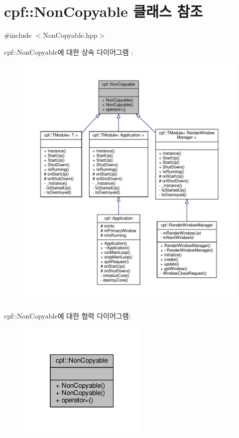 \hypertarget{classcpf_1_1_non_copyable}{}\section{cpf\+:\+:Non\+Copyable 클래스 참조}
\label{classcpf_1_1_non_copyable}


{\ttfamily \#include $<$Non\+Copyable.\+hpp$>$}



cpf\+:\+:Non\+Copyable에 대한 상속 다이어그램 \+: 
\nopagebreak
\begin{figure}[H]
\begin{center}
\leavevmode
\includegraphics[width=350pt]{classcpf_1_1_non_copyable__inherit__graph}
\end{center}
\end{figure}


cpf\+:\+:Non\+Copyable에 대한 협력 다이어그램\+:
\nopagebreak
\begin{figure}[H]
\begin{center}
\leavevmode
\includegraphics[width=175pt]{classcpf_1_1_non_copyable__coll__graph}
\end{center}
\end{figure}

